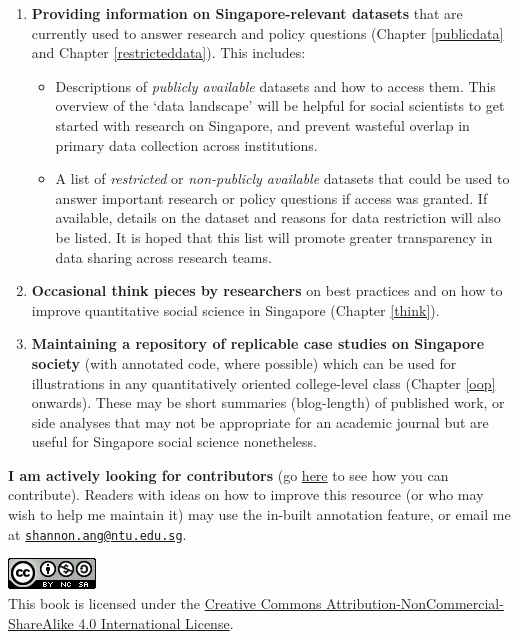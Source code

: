 \documentclass[
  openany]{book}
\providecommand{\tightlist}{%
  \setlength{\itemsep}{0pt}\setlength{\parskip}{0pt}}
\begin{document}
\begin{enumerate}
\def\labelenumi{\arabic{enumi}.}
\tightlist
\item
  \textbf{Providing information on Singapore-relevant datasets} that are currently used to answer research and policy questions (Chapter \ref{publicdata} and Chapter \ref{restricteddata}). This includes:

  \begin{itemize}
  \tightlist
  \item
    Descriptions of \emph{publicly available} datasets and how to access them. This overview of the `data landscape' will be helpful for social scientists to get started with research on Singapore, and prevent wasteful overlap in primary data collection across institutions.
  \item
    A list of \emph{restricted} or \emph{non-publicly available} datasets that could be used to answer important research or policy questions if access was granted. If available, details on the dataset and reasons for data restriction will also be listed. It is hoped that this list will promote greater transparency in data sharing across research teams.
  \end{itemize}
\item
  \textbf{Occasional think pieces by researchers} on best practices and on how to improve quantitative social science in Singapore (Chapter \ref{think}).
\item
  \textbf{Maintaining a repository of replicable case studies on Singapore society} (with annotated code, where possible) which can be used for illustrations in any quantitatively oriented college-level class (Chapter \ref{oop} onwards). These may be short summaries (blog-length) of published work, or side analyses that may not be appropriate for an academic journal but are useful for Singapore social science nonetheless.
\end{enumerate}

\textbf{I am actively looking for contributors} (go \href{https://sg-numbers.netlify.com/how-to-contribute.html}{here} to see how you can contribute). Readers with ideas on how to improve this resource (or who may wish to help me maintain it) may use the in-built annotation feature, or email me at \href{mailto:shannon.ang@ntu.edu.sg}{\nolinkurl{shannon.ang@ntu.edu.sg}}.

\includegraphics{images/cc.png}\\
This book is licensed under the \href{http://creativecommons.org/licenses/by-nc-sa/4.0/}{Creative Commons Attribution-NonCommercial-ShareAlike 4.0 International License}.
\end{document}
